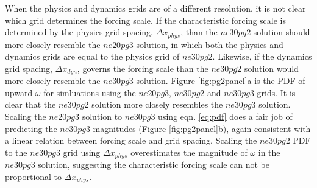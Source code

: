 \documentclass{agujournal}
\begin{document}
When the physics and dynamics grids are of a different resolution, it is not clear which grid determines the forcing scale. If the characteristic forcing scale is determined by the physics grid spacing, $\Delta x_{phys}$, than the $ne30pg2$ solution should more closely resemble the $ne20pg3$ solution, in which both the physics and dynamics grids are equal to the physics grid of $ne30pg2$. Likewise, if the dynamics grid spacing, $\Delta x_{dyn}$, governs the forcing scale than the $ne30pg2$ solution would more closely resemble the $ne30pg3$ solution. Figure \ref{fig:pg2panel}a is the PDF of upward $\omega$ for simluations using the $ne20pg3$, $ne30pg2$ and $ne30pg3$ grids. It is clear that the $ne30pg2$ solution more closely resembles the $ne30pg3$ solution. Scaling the $ne20pg3$ solution to $ne30pg3$ using eqn. \ref{eq:pdf} does a fair job of predicting the $ne30pg3$ magnitudes (Figure \ref{fig:pg2panel}b), again consistent with a linear relation between forcing scale and grid spacing. Scaling the $ne30pg2$ PDF to the $ne30pg3$ grid using $\Delta x_{phys}$ overestimates the magnitude of $\omega$ in the $ne30pg3$ solution, suggesting the characteristic forcing scale can not be proportional to $\Delta x_{phys}$. 
\end{document}
